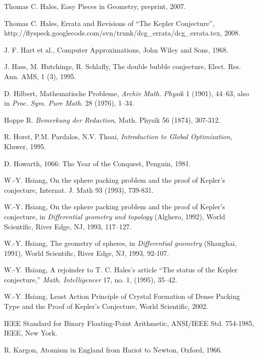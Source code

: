 \begin{thebibliography}{CHMS94}
 Thomas C. Hales, Easy Pieces in Geometry, preprint, 2007.

 Thomas C. Hales, Errata and Revisions of ``The Kepler Conjecture'',
   http://flyspeck.googlecode.com/svn/trunk/dcg\_errata/dcg\_errata.tex, 2008.

 J. F. Hart et al., Computer Approximations,
John Wiley and Sons, 1968.

 J. Hass, M. Hutchings, R. Schlafly, The double bubble conjecture,
   Elect. Res. Ann.  AMS, 1 (3), 1995.

 D. Hilbert, Mathematische Probleme, {\it Archiv Math. Physik} 1 (1901),
    44--63, also in {\it Proc. Sym. Pure Math.} 28 (1976), 1--34.

 Hoppe R. {\it Bemerkung der Redaction}, Math. Physik 56
(1874), 307-312.

 R. Horst, P.M. Pardalos, N.V. Thoai, {\it Introduction
    to Global Optimization}, Kluwer, 1995.

 D. Howarth, 1066: The Year of the Conquest, Penguin, 1981.

 W.-Y. Hsiang, On the sphere packing problem and the proof
    of Kepler's conjecture, Internat. J. Math 93 (1993), 739-831.

 W.-Y. Hsiang, On the sphere packing problem and the
    proof of Kepler's conjecture, in {\it Differential geometry and
    topology} (Alghero, 1992), World Scientific, River Edge,
    NJ, 1993,  117--127.

 W.-Y. Hsiang, The geometry of spheres, in {\it Differential
    geometry} (Shanghai, 1991), World Scientific, River Edge, NJ,
    1993, 92-107.

 W.-Y. Hsiang, A rejoinder to T. C. Hales's article ``The status
    of the Kepler conjecture,'' {\it Math. Intelligencer} 17, no. 1, (1995),
    35--42.

 W.-Y. Hsiang, Least Action Principle of Crystal Formation
of Dense Packing Type and the Proof of Kepler's Conjecture, World
Scientific, 2002.

 IEEE Standard for Binary Floating-Point
Arithmetic, ANSI/IEEE Std. 754-1985, IEEE, New York.


 R. Kargon, Atomism in England from Hariot to Newton,
    Oxford, 1966.


\end{thebibliography}
